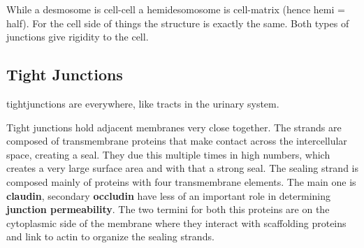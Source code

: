 \documentclass[../main.tex]{subfiles}
\begin{document}
\begin{figure}[H]
	\centering
	\caption{}
	\label{fig:desm}
\end{figure}

While a desmosome is cell-cell a hemidesomosome is cell-matrix (hence hemi = half). For the cell side of things the structure is exactly the same. Both types of junctions give rigidity to the cell.

\subsection{Tight Junctions}

\gls{tightjunctions} are everywhere, like tracts in the urinary system. 

Tight junctions hold adjacent membranes very close together. The strands are composed of transmembrane proteins that make contact across the intercellular space, creating a seal. They due this multiple times in high numbers, which creates a very large surface area and with that a strong seal. The sealing strand is composed mainly of proteins with four transmembrane elements. The main one is \textbf{\gls{claudin}}, secondary \textbf{\gls{occludin}} have less of an important role in determining \textbf{junction permeability}. The two termini for both this proteins are on the cytoplasmic side of the membrane where they interact with scaffolding proteins and link to actin to organize the sealing strands.
\end{document}
